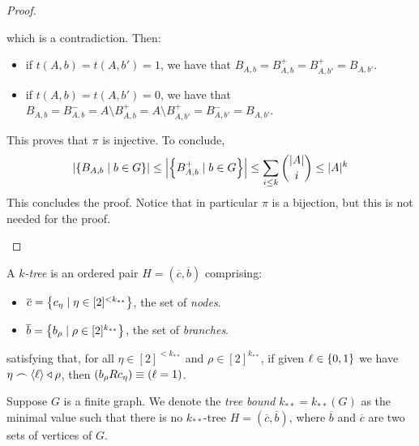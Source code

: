 \begin{corollary}[Claim 2.6.1]
\begin{proof}
\begin{enumerate}
                which is a contradiction.
                Then:
                \begin{itemize}
                    \item if $t(A,b) = t(A,b') = 1$, we have that $B_{A,b} = B^+_{A,b} = B^+_{A,b'} = B_{A,b'}$.
                    \item if $t(A,b) = t(A,b') = 0$, we have that
                    $B_{A,b} = B^-_{A,b} = A \setminus B^+_{A,b} = A \setminus B^+_{A,b'} = B^-_{A,b'} = B_{A,b'}$.
                \end{itemize}
                This proves that $\pi$ is injective.
                To conclude,
                \[
                    \left| \left\{ B_{A,b} \mid b \in G \right\} \right| \leq
                    \left| \left\{ B^+_{A,b} \mid b \in G \right\} \right| \leq
                    \sum_{i \leq k} \binom{|A|}{i} \leq |A|^k
                \]
                This concludes the proof.
                Notice that in particular $\pi$ is a bijection, but this is not needed for the proof.
        \end{enumerate}
        \end{proof}
    \end{corollary}


    \begin{definition} \label{def:k-tree}
        A \emph{$k$-tree} is an ordered pair $H = (\overline{c},\overline{b})$ comprising:
        \begin{itemize}
            \item $\overline{c} = \left\{  c_\eta \mid \eta \in [2]^{<k_{**}}  \right\}$, the set of \emph{nodes}.
            \item $\overline{b} = \left\{  b_\rho \mid \rho \in [2]^{k_{**}}  \right\}$, the set of \emph{branches}.
        \end{itemize}
        satisfying that, for all $\eta \in [2]^{<k_{**}}$ and $\rho \in [2]^{k_{**}}$,
        if given $\ell \in \left\{ 0, 1 \right\}$ we have $\eta \frown \left< \ell \right> \triangleleft \rho$, then
        $\left( b_\rho R c_\eta \right) \equiv \left( \ell = 1 \right)$.
    \end{definition}


    \begin{definition}[Definition 2.11] \label{def:tree_bound}
        Suppose $G$ is a finite graph.
        We denote the \emph{tree bound} $k_{**} = k_{**}(G)$ as the minimal value such that there is no $k_{**}$-tree
        $H = (\overline{c},\overline{b})$, where $\overline{b}$ and $\overline{c}$ are two sets of vertices of $G$.
    \end{definition}

